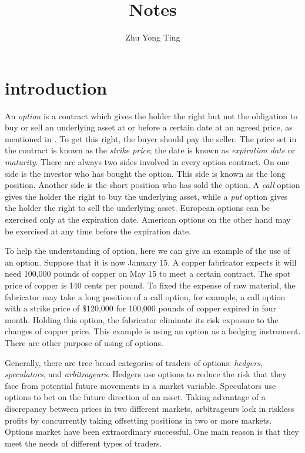 \documentclass[11pt]{book}
\title{Notes}
\author{Zhu Yong Ting}
\begin{document}
 

\maketitle
\chapter{introduction}


An {\it option} is a contract which gives the holder the right but not the obligation to buy or sell an underlying asset at or before a certain date at an agreed price, as mentioned in \citeauthor{Hull2008}.
To get this right, the buyer should pay the seller. The price set in the contract is known as the {\it strike price}; the date is known as {\it expiration date} or {\it maturity}. There are always two sides involved in every option contract. On one side is the investor who has bought the option. This side is known as the long position. Another side is the short position who has sold the option. A {\it call} option gives the holder the right to buy the underlying asset, while a {\it put} option gives the holder the right to sell the underlying asset. European options can be exercised only at the expiration date. American options on the other hand may be exercised at any time before the expiration date.

To help the understanding of option, here we can give an example of the use of an option. Suppose that it is now January 15. A copper fabricator expects it will need 100,000 pounds of copper on May 15 to meet a certain contract. The spot price of copper is 140 cents per pound. To fixed the expense of raw material, the fabricator may take a long position of a call option, for example, a call option with a strike price of \$120,000 for 100,000 pounds of copper expired in four month. Holding this option, the fabricator eliminate its risk exposure to the changes of copper price. This example is using an option as a hedging instrument. There are other purpose of using of options.

Generally, there are tree broad categories of traders of options: {\it hedgers}, {\it speculators}, and {\it arbitrageurs}. Hedgers use options to reduce the risk that they face from potential future movements in a market variable. Speculators use options to bet on the future direction of an asset. Taking advantage of a discrepancy between prices in two different markets, arbitrageurs lock in riskless profits by concurrently taking offsetting positions in two or more markets. Options market have been extraordinary successful. One main reason is that they meet the needs of different types of traders.
\end{document}
